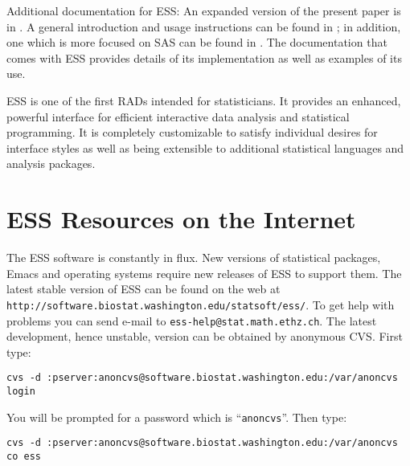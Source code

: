 \documentclass{article}
\def\url#1{\stexttt{#1}} %
\newcommand{\stexttt}[1]{{\small\texttt{#1}}}
\begin{document}
Additional documentation for ESS: An expanded version of
the present paper is in
\citep{RMHHS:2001}.  A general introduction and usage instructions can
be found in \citep{heiberger:dsc:2001}; in addition, one which is more
focused on SAS can be found in \citep{heiberger:philasugi:2001}.  The
documentation that comes with ESS provides details of its
implementation as well as examples of its use.

ESS is one of the first RADs intended for statisticians.  It provides
an enhanced, powerful interface for efficient interactive data
analysis and statistical programming.  It is completely customizable
to satisfy individual desires for interface styles as well as being
extensible to additional statistical languages and analysis packages.


\section*{ESS Resources on the Internet}
\label{sec:access}
The ESS software is constantly in flux.  New versions of statistical
packages, Emacs and operating systems require new releases of ESS to
support them.  The latest stable version of ESS can be found on the web at
\url{http://software.biostat.washington.edu/statsoft/ess/}.  To get help
with problems you can send e-mail to \url{ess-help@stat.math.ethz.ch}.
The latest development, hence unstable, version can be obtained by
anonymous CVS.  First type:

  \stexttt{cvs -d :pserver:anoncvs@software.biostat.washington.edu:/var/anoncvs login}

  You will be prompted for a password which is ``\stexttt{anoncvs}''.  Then type: 

  \stexttt{cvs -d :pserver:anoncvs@software.biostat.washington.edu:/var/anoncvs co ess}
  




\end{document}
